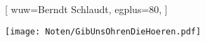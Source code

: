 [
    wuw={Berndt Schlaudt}, 
    egplus={80},
]

\beginverse
\endverse
\centering\texttt{[image: Noten/GibUnsOhrenDieHoeren.pdf]}	

\endsong
